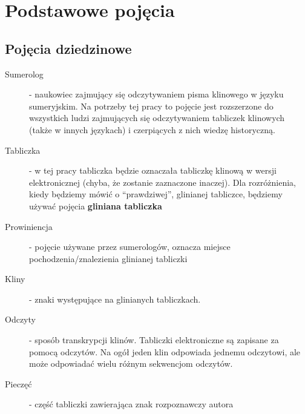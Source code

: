 \chapter{Podstawowe pojęcia}\label{r:pojecia}
\section{Pojęcia dziedzinowe}
\begin{description}
 \item[Sumerolog] - naukowiec zajmujący się odczytywaniem pisma klinowego w języku sumeryjskim. Na potrzeby tej pracy
		      to pojęcie jest rozszerzone do wszystkich ludzi zajmujących się odczytywaniem tabliczek klinowych (także w innych językach) i czerpiących z nich wiedzę historyczną.
 \item[Tabliczka] - w tej pracy tabliczka będzie oznaczała tabliczkę klinową w wersji elektronicznej 
		  (chyba, że zostanie zaznaczone inaczej). Dla rozróżnienia, kiedy będziemy mówić o ``prawdziwej'', 
		  glinianej tabliczce, będziemy używać pojęcia \textbf{gliniana tabliczka}
 \item[Prowiniencja] - pojęcie używane przez sumerologów, oznacza miejsce pochodzenia/znalezienia glinianej tabliczki
 \item[Kliny] - znaki występujące na glinianych tabliczkach.
 \item[Odczyty] - sposób transkrypcji klinów. Tabliczki elektroniczne są zapisane za pomocą odczytów. Na ogół jeden klin odpowiada jednemu odczytowi, ale może odpowiadać wielu różnym sekwencjom odczytów.
 \item[Pieczęć] - część tabliczki zawierająca znak rozpoznawczy autora
\end{description}

